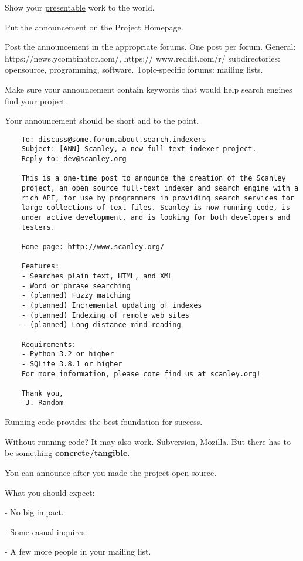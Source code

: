 \documentclass[landscape,30pt]{foils}
\begin{document}
Show your \underline{presentable} work to the world.

Put the announcement on the Project Homepage.

Post the announcement in the appropriate forums.   One post per forum.  General: https://news.ycombinator.com/, https://
www.reddit.com/r/ subdirectories: opensource, programming, software.  Topic-specific forums: mailing lists. 

Make sure your announcement contain keywords that would help search engines find your project.

Your announcement should be short and to the point.

{\tiny
\begin{verbatim}
    To: discuss@some.forum.about.search.indexers
    Subject: [ANN] Scanley, a new full-text indexer project.
    Reply-to: dev@scanley.org

    This is a one-time post to announce the creation of the Scanley
    project, an open source full-text indexer and search engine with a
    rich API, for use by programmers in providing search services for
    large collections of text files. Scanley is now running code, is
    under active development, and is looking for both developers and
    testers.

    Home page: http://www.scanley.org/

    Features:
    - Searches plain text, HTML, and XML
    - Word or phrase searching
    - (planned) Fuzzy matching
    - (planned) Incremental updating of indexes
    - (planned) Indexing of remote web sites
    - (planned) Long-distance mind-reading

    Requirements:
    - Python 3.2 or higher
    - SQLite 3.8.1 or higher
    For more information, please come find us at scanley.org!

    Thank you,
    -J. Random
\end{verbatim}
}

Running code provides the best foundation for success.

Without running code?  It may also work.  Subversion, Mozilla.   But there has to be something {\bf concrete/tangible}.

You can announce after you made the project open-source.

What you should expect:

- No big impact.

- Some casual inquires.

- A few more people in your mailing list.
\end{document}
